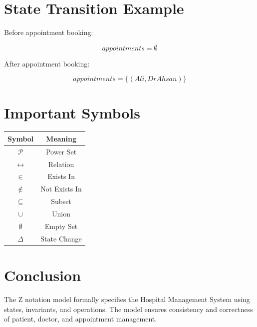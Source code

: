\documentclass[12pt]{article}
\begin{document}
\section{State Transition Example}

Before appointment booking:

\[
appointments = \emptyset
\]

After appointment booking:

\[
appointments = \{(Ali, DrAhsan)\}
\]

\section{Important Symbols}

\begin{tabular}{|c|c|}
\hline
Symbol & Meaning \\
\hline
$\mathcal{P}$ & Power Set \\
\hline
$\leftrightarrow$ & Relation \\
\hline
$\in$ & Exists In \\
\hline
$\notin$ & Not Exists In \\
\hline
$\subseteq$ & Subset \\
\hline
$\cup$ & Union \\
\hline
$\emptyset$ & Empty Set \\
\hline
$\Delta$ & State Change \\
\hline
\end{tabular}

\section{Conclusion}

The Z notation model formally specifies the Hospital Management System using states, invariants, and operations. The model ensures consistency and correctness of patient, doctor, and appointment management.
\end{document}
